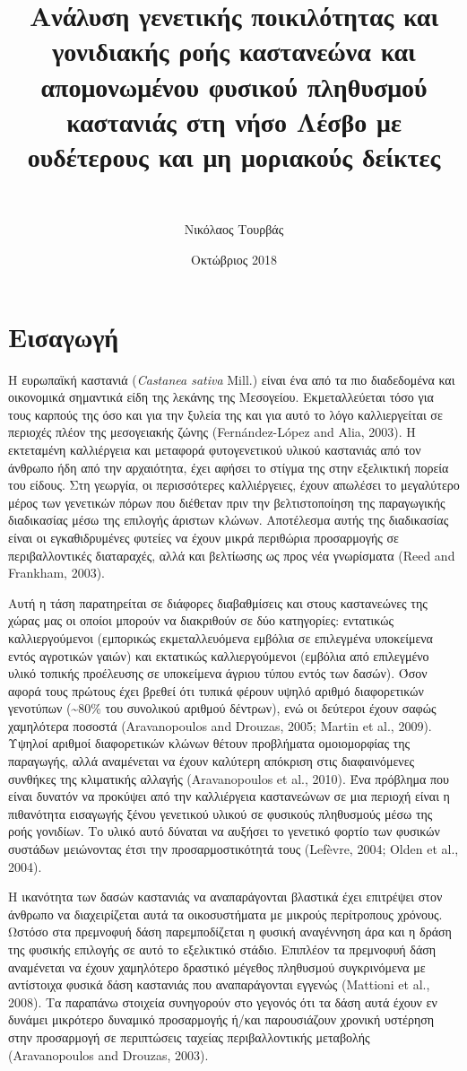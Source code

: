 \documentclass[12pt,a4paper,]{report}
\title{Ανάλυση γενετικής ποικιλότητας και γονιδιακής ροής καστανεώνα και
απομονωμένου φυσικού πληθυσμού καστανιάς στη νήσο Λέσβο με ουδέτερους
και μη μοριακούς δείκτες}
\subtitle{~}
\author{Νικόλαος Τουρβάς}
\date{Οκτώβριος 2018}
\begin{document}
\maketitle

\section{Εισαγωγή}

Η ευρωπαϊκή καστανιά (\emph{Castanea sativa} Mill.) είναι ένα από τα πιο
διαδεδομένα και οικονομικά σημαντικά είδη της λεκάνης της Μεσογείου.
Εκμεταλλεύεται τόσο για τους καρπούς της όσο και για την ξυλεία της και
για αυτό το λόγο καλλιεργείται σε περιοχές πλέον της μεσογειακής ζώνης
(Fernández-López and Alia, 2003). Η εκτεταμένη καλλιέργεια και μεταφορά
φυτογενετικού υλικού καστανιάς από τον άνθρωπο ήδη από την αρχαιότητα,
έχει αφήσει το στίγμα της στην εξελικτική πορεία του είδους. Στη
γεωργία, οι περισσότερες καλλιέργειες, έχουν απωλέσει το μεγαλύτερο
μέρος των γενετικών πόρων που διέθεταν πριν την βελτιστοποίηση της
παραγωγικής διαδικασίας μέσω της επιλογής άριστων κλώνων. Αποτέλεσμα
αυτής της διαδικασίας είναι οι εγκαθιδρυμένες φυτείες να έχουν μικρά
περιθώρια προσαρμογής σε περιβαλλοντικές διαταραχές, αλλά και βελτίωσης
ως προς νέα γνωρίσματα (Reed and Frankham, 2003).

Αυτή η τάση παρατηρείται σε διάφορες διαβαθμίσεις και στους καστανεώνες
της χώρας μας οι οποίοι μπορούν να διακριθούν σε δύο κατηγορίες:
εντατικώς καλλιεργούμενοι (εμπορικώς εκμεταλλευόμενα εμβόλια σε
επιλεγμένα υποκείμενα εντός αγροτικών γαιών) και εκτατικώς
καλλιεργούμενοι (εμβόλια από επιλεγμένο υλικό τοπικής προέλευσης σε
υποκείμενα άγριου τύπου εντός των δασών). Όσον αφορά τους πρώτους έχει
βρεθεί ότι τυπικά φέρουν υψηλό αριθμό διαφορετικών γενοτύπων
(\textasciitilde{}80\% του συνολικού αριθμού δέντρων), ενώ οι δεύτεροι
έχουν σαφώς χαμηλότερα ποσοστά (Aravanopoulos and Drouzas, 2005; Martin
et al., 2009). Υψηλοί αριθμοί διαφορετικών κλώνων θέτουν προβλήματα
ομοιομορφίας της παραγωγής, αλλά αναμένεται να έχουν καλύτερη απόκριση
στις διαφαινόμενες συνθήκες της κλιματικής αλλαγής (Aravanopoulos et
al., 2010). Ένα πρόβλημα που είναι δυνατόν να προκύψει από την
καλλιέργεια καστανεώνων σε μια περιοχή είναι η πιθανότητα εισαγωγής
ξένου γενετικού υλικού σε φυσικούς πληθυσμούς μέσω της ροής γονιδίων. Το
υλικό αυτό δύναται να αυξήσει το γενετικό φορτίο των φυσικών συστάδων
μειώνοντας έτσι την προσαρμοστικότητά τους (Lefèvre, 2004; Olden et al.,
2004).

Η ικανότητα των δασών καστανιάς να αναπαράγονται βλαστικά έχει επιτρέψει
στον άνθρωπο να διαχειρίζεται αυτά τα οικοσυστήματα με μικρούς
περίτροπους χρόνους. Ωστόσο στα πρεμνοφυή δάση παρεμποδίζεται η φυσική
αναγέννηση άρα και η δράση της φυσικής επιλογής σε αυτό το εξελικτικό
στάδιο. Επιπλέον τα πρεμνοφυή δάση αναμένεται να έχουν χαμηλότερο
δραστικό μέγεθος πληθυσμού συγκρινόμενα με αντίστοιχα φυσικά δάση
καστανιάς που αναπαράγονται εγγενώς (Mattioni et al., 2008). Τα παραπάνω
στοιχεία συνηγορούν στο γεγονός ότι τα δάση αυτά έχουν εν δυνάμει
μικρότερο δυναμικό προσαρμογής ή/και παρουσιάζουν χρονική υστέρηση στην
προσαρμογή σε περιπτώσεις ταχείας περιβαλλοντικής μεταβολής
(Aravanopoulos and Drouzas, 2003).
\end{document}
